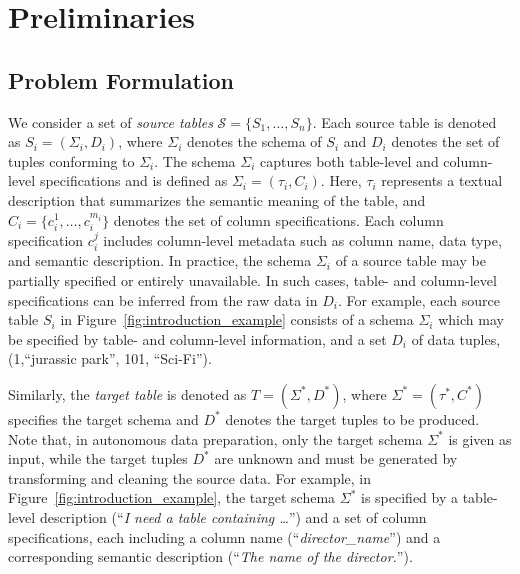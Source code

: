 
\section{Preliminaries}
\label{sec:preliminary}


\subsection{Problem Formulation}
\label{subsec:problem_definition}

We consider a set of \emph{source tables} $\mathcal{S} = \{S_1, \ldots, S_n\}$. Each source table is denoted as $S_i = (\Sigma_i, D_i)$, where $\Sigma_i$ denotes the schema of $S_i$ and $D_i$ denotes the set of tuples conforming to $\Sigma_i$. The schema $\Sigma_i$ captures both table-level and column-level specifications and is defined as $\Sigma_i = (\tau_i, C_i)$. Here, $\tau_i$ represents a textual description that summarizes the semantic meaning of the table, and $C_i = \{c_i^{1}, \ldots, c_i^{m_i}\}$ denotes the set of column specifications. Each column specification $c_i^{j}$ includes column-level metadata such as column name, data type, and semantic description.
In practice, the schema $\Sigma_i$ of a source table may be partially specified or entirely unavailable. In such cases, table- and column-level specifications can be inferred from the raw data in $D_i$. 
For example, each source table $S_i$ in Figure~\ref{fig:introduction_example} consists of a schema $\Sigma_i$ which may be specified by table- and column-level information, and a set $D_i$ of data tuples, \eg (1,``jurassic park'', 101, ``Sci-Fi'').


Similarly, the \emph{target table} is denoted as $T=(\Sigma^{\ast}, D^{\ast})$, where $\Sigma^\ast = (\tau^\ast, C^\ast)$ specifies the target schema and $D^\ast$ denotes the target tuples to be produced. 
Note that, in autonomous data preparation, only the target schema $\Sigma^\ast$ is given as input, while the target tuples $D^\ast$ are unknown and must be generated by transforming and cleaning the source data.
For example, in Figure~\ref{fig:introduction_example}, the target schema $\Sigma^{\ast}$ is specified by a table-level description (\eg ``\emph{I need a table containing \ldots}'') and a set of column specifications, each including a column name (\eg ``\emph{director\_name}'') and a corresponding semantic description (\eg ``\emph{The name of the director.}'').

